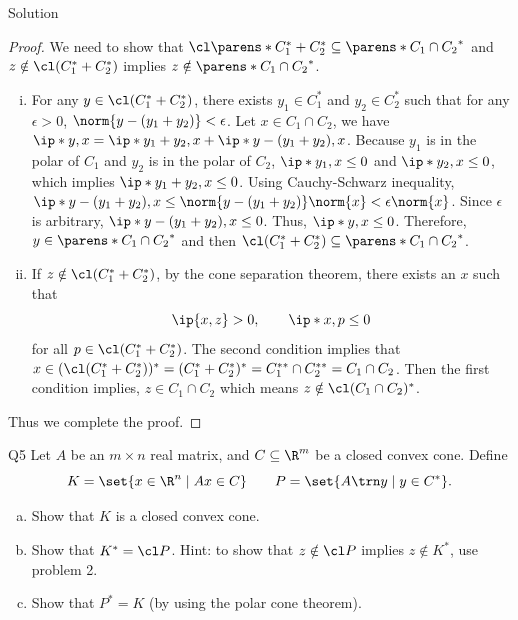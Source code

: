 \documentclass{article}
\theoremstyle{plain}
\theoremstyle{definition}
\theoremstyle{remark}
\begin{document}
\begin{solution}
    {Solution}
    \begin{proof}
        We need to show that $\cl \parens*{C_1^*+C_2^*} \subseteq \parens*{C_1\cap C_2}^*$ and $z\notin\cl(C_1^*+C_2^*)$ implies $z\notin \parens*{C_1\cap C_2}^*$.
        \begin{enumerate}[(i)]
            \item {
                For any $y\in \cl(C_1^*+C_2^*)$, there exists $y_1\in C_1^*$ and $y_2\in C_2^*$ such that for any $\epsilon>0$, $\norm{y-(y_1+y_2)}<\epsilon$. Let $x\in C_1\cap C_2$, we have $\ip*{y, x}=\ip*{y_1+y_2, x}+\ip*{y-(y_1+y_2), x}$. Because $y_1$ is in the polar of $C_1$ and $y_2$ is in the polar of $C_2$, $\ip*{y_1, x}\leq 0$ and $\ip*{y_2, x}\leq 0$, which implies $\ip*{y_1+y_2, x}\leq 0$. Using Cauchy-Schwarz inequality, $\ip*{y-(y_1+y_2), x}\leq \norm{y-(y_1+y_2)}\norm{x}<\epsilon\norm{x}$. Since $\epsilon$ is arbitrary, $\ip*{y-(y_1+y_2), x}\leq 0$. Thus, $\ip*{y, x}\leq 0$. Therefore, $y\in \parens*{C_1\cap C_2}^*$ and then $\cl(C_1^*+C_2^*)\subseteq \parens*{C_1\cap C_2}^*$.
            }
            \item {
                If $z\notin\cl(C_1^*+C_2^*)$, by the cone separation theorem, there exists an $x$ such that \[\ip{x,z}>0, \qquad \ip*{x,p}\leq 0\] for all $p\in \cl(C_1^*+C_2^*)$. The second condition implies that $x\in(\cl(C_1^*+C_2^*))^*=(C_1^*+C_2^*)^*=C_1^{**}\cap C_2^{**}=C_1\cap C_2$. Then the first condition implies, $z\in C_1\cap C_2$ which means $z\notin\cl(C_1\cap C_2)^*$.
            }
        \end{enumerate}
        Thus we complete the proof.
    \end{proof}
\end{solution}

\begin{problem}
    {Q5}
    Let $A$ be an $m\times n$ real matrix, and $C\subseteq \R^m$ be a closed convex cone. Define \[K=\set{x\in\R^n\mid Ax\in C} \qquad P=\set{A\trn y\mid y\in C^*}.\]
    \begin{enumerate}[(a)]
        \item Show that $K$ is a closed convex cone.
        \item Show that $K^*=\cl P$. Hint: to show that $z\notin \cl P$ implies $z\notin K^*$, use problem 2.
        \item Show that $P^*=K$ (by using the polar cone theorem).
    \end{enumerate}
\end{problem}
\end{document}
